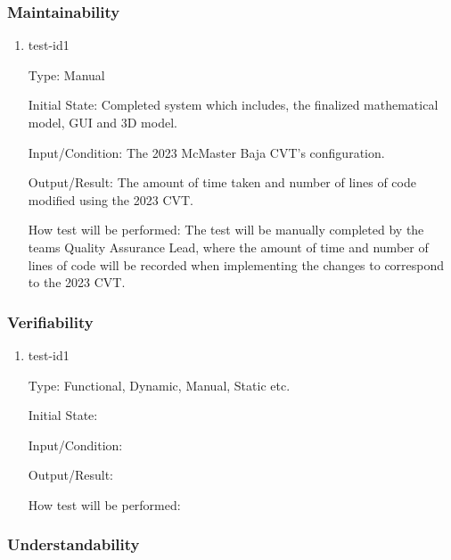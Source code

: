 \documentclass[12pt, titlepage]{article}
\begin{document}
\subsubsection{Maintainability}

\begin{enumerate}

\item{test-id1\\}

Type: Manual
					
Initial State: Completed system which includes, the finalized mathematical model, GUI and 3D model.  
					
Input/Condition: The 2023 McMaster Baja CVT's configuration. 
					
Output/Result: The amount of time taken and number of lines of code modified using the 2023 CVT.
					
How test will be performed: The test will be manually completed by the teams Quality Assurance Lead, where the amount of time and number of lines of code will be recorded when implementing the changes to correspond to the 2023 CVT.

\end{enumerate}

\subsubsection{Verifiability}

\begin{enumerate}

\item{test-id1\\}

Type: Functional, Dynamic, Manual, Static etc.
					
Initial State: 
					
Input/Condition: 
					
Output/Result: 
					
How test will be performed: 

\end{enumerate}

\subsubsection{Understandability}
\end{document}
